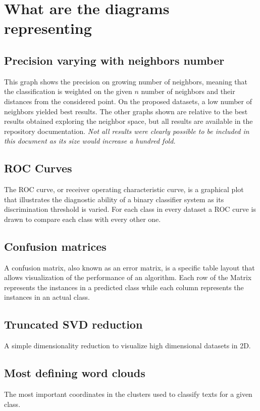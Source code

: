 \documentclass[\main/main.tex]{subfiles}
\begin{document}
\section{What are the diagrams representing}
\subsection{Precision varying with neighbors number}
This graph shows the precision on growing number of neighbors, meaning that the classification is weighted on the given \(n\) number of neighbors and their distances from the considered point. On the proposed datasets, a low number of neighbors yielded best results. The other graphs shown are relative to the best results obtained exploring the neighbor space, but all results are available in the repository documentation. \textit{Not all results were clearly possible to be included in this document as its size would increase a hundred fold.}

\subsection{ROC Curves}
The ROC curve, or receiver operating characteristic curve, is a graphical plot that illustrates the diagnostic ability of a binary classifier system as its discrimination threshold is varied. For each class in every dataset a ROC curve is drawn to compare each class with every other one.

\subsection{Confusion matrices}
A confusion matrix, also known as an error matrix, is a specific table layout that allows visualization of the performance of an algorithm. Each row of the Matrix represents the instances in a predicted class while each column represents the instances in an actual class.

\subsection{Truncated SVD reduction}
A simple dimensionality reduction to visualize high dimensional datasets in 2D.

\subsection{Most defining word clouds}
The most important coordinates in the clusters used to classify texts for a given class.
\end{document}
